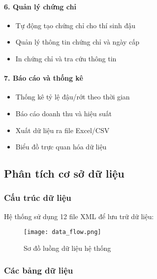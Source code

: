 \documentclass[12pt,a4paper]{article}
\begin{document}
\paragraph{6. Quản lý chứng chỉ}
\begin{itemize}
    \item Tự động tạo chứng chỉ cho thí sinh đậu
    \item Quản lý thông tin chứng chỉ và ngày cấp
    \item In chứng chỉ và tra cứu thông tin
\end{itemize}

\paragraph{7. Báo cáo và thống kê}
\begin{itemize}
    \item Thống kê tỷ lệ đậu/rớt theo thời gian
    \item Báo cáo doanh thu và hiệu suất
    \item Xuất dữ liệu ra file Excel/CSV
    \item Biểu đồ trực quan hóa dữ liệu
\end{itemize}

\subsection{Phân tích cơ sở dữ liệu}

\subsubsection{Cấu trúc dữ liệu}

Hệ thống sử dụng 12 file XML để lưu trữ dữ liệu:

\begin{figure}[H]
\centering
\texttt{[image: data\_flow.png]}
\caption{Sơ đồ luồng dữ liệu hệ thống}
\label{fig:data_flow}
\end{figure}

\subsubsection{Các bảng dữ liệu}
\end{document}

